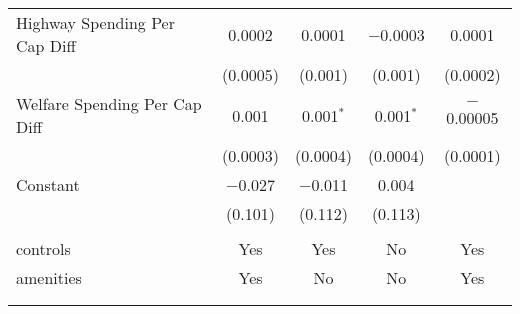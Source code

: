 \begin{table}[!htbp]
\begin{tabular}{@{\extracolsep{5pt}}lcccc}
  Highway Spending Per Cap Diff & 0.0002 & 0.0001 & $-$0.0003 & 0.0001 \\ 
  & (0.0005) & (0.001) & (0.001) & (0.0002) \\ 
  Welfare Spending Per Cap Diff & 0.001 & 0.001$^{*}$ & 0.001$^{*}$ & $-$0.00005 \\ 
  & (0.0003) & (0.0004) & (0.0004) & (0.0001) \\ 
  Constant & $-$0.027 & $-$0.011 & 0.004 &  \\ 
  & (0.101) & (0.112) & (0.113) &  \\ 
 \hline \\[-1.8ex] 
controls & Yes & Yes & No & Yes \\ 
amenities & Yes & No & No & Yes \\ 
\hline \\[-1.8ex] 
\hline 
\hline \\[-1.8ex] 
\end{tabular} 
\end{table} 

